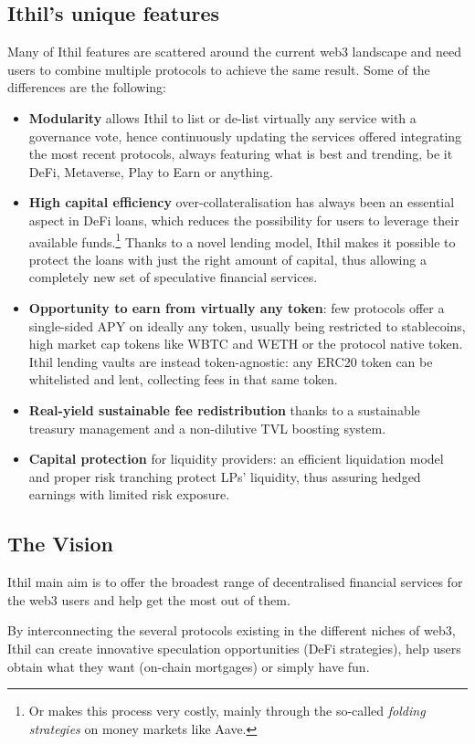 \documentclass[a4paper,10 pt]{article}
\theoremstyle{definition}
\begin{document}
\subsection{Ithil's unique features}
Many of Ithil features are scattered around the current web3 landscape and need users to combine multiple protocols to achieve the same result. Some of the differences are the following:
\begin{itemize}
\item {\bf Modularity} allows Ithil to list or de-list virtually any service with a governance vote, hence continuously updating the services offered integrating the most recent protocols, always featuring what is best and trending, be it DeFi, Metaverse, Play to Earn or anything.
\item {\bf High capital efficiency} over-collateralisation has always been an essential aspect in DeFi loans, which reduces the possibility for users to leverage their available funds.\footnote{Or makes this process very costly, mainly through the so-called {\it folding strategies} on money markets like Aave.} Thanks to a novel lending model, Ithil makes it possible to protect the loans with just the right amount of capital, thus allowing a completely new set of speculative financial services.
\item {\bf Opportunity to earn from virtually any token}: few protocols offer a single-sided APY on ideally any token, usually being restricted to stablecoins, high market cap tokens like WBTC and WETH or the protocol native token. Ithil lending vaults are instead token-agnostic: any ERC20 token can be whitelisted and lent, collecting fees in that same token.
\item {\bf Real-yield sustainable fee redistribution} thanks to a sustainable treasury management and a non-dilutive TVL boosting system.
\item {\bf Capital protection} for liquidity providers: an efficient liquidation model and proper risk tranching protect LPs' liquidity, thus assuring hedged earnings with limited risk exposure.
\end{itemize}

\subsection{The Vision}
Ithil main aim is to offer the broadest range of decentralised financial services for the web3 users and help get the most out of them.

By interconnecting the several protocols existing in the different niches of web3, Ithil can create innovative speculation opportunities (DeFi strategies), help users obtain what they want (on-chain mortgages) or simply have fun.
\end{document}
